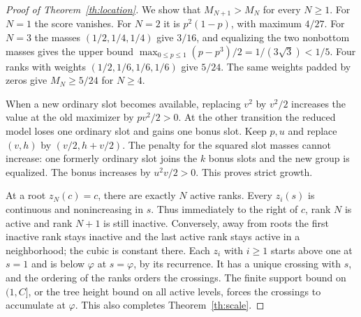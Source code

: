 \documentclass[11pt]{article}
\newcommand{\ph}{\varphi}
\begin{document}
\begin{proof}[Proof of Theorem~\ref{th:location}]
We show that $M_{N+1}>M_N$ for every $N\ge1$. For $N=1$ the
score vanishes. For $N=2$ it is $p^2(1-p)$, with maximum $4/27$.
For $N=3$ the masses $(1/2,1/4,1/4)$ give $3/16$, and equalizing
the two nonbottom masses gives the upper bound
$\max_{0\le p\le1}(p-p^3)/2=1/(3\sqrt3)<1/5$.
Four ranks with weights $(1/2,1/6,1/6,1/6)$ give $5/24$.
The same weights padded by zeros give $M_N\ge5/24$ for $N\ge4$.

When a new ordinary slot becomes available, replacing $v^2$ by $v^2/2$
increases the value at the old maximizer by $pv^2/2>0$.
At the other transition the reduced model loses one ordinary slot and gains one bonus slot.
Keep $p,u$ and replace $(v,h)$ by $(v/2,h+v/2)$. The penalty for the
squared slot masses cannot increase: one formerly ordinary slot
joins the $k$ bonus slots and the new group is equalized. The bonus
increases by $u^2v/2>0$. This proves strict growth.

At a root $z_N(c)=c$, there are exactly $N$ active ranks. Every
$z_i(s)$ is continuous and nonincreasing in $s$. Thus immediately
to the right of $c$, rank $N$ is active and rank $N+1$ is still
inactive. Conversely, away from roots the first inactive rank stays
inactive and the last active rank stays active in a neighborhood;
the cubic is constant there. Each $z_i$ with $i\ge1$ starts above
one at $s=1$ and is below $\ph$ at $s=\ph$, by its recurrence.
It has a unique crossing with $s$, and the ordering of the ranks
orders the crossings. The finite support bound on $(1,C]$, or the
tree height bound on all active levels, forces the crossings to
accumulate at $\ph$. This also completes Theorem~\ref{th:scale}.
\end{proof}
\end{document}
